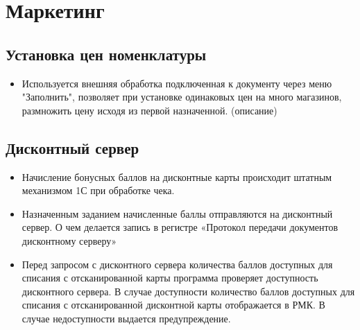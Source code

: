 \section{Маркетинг}
\subsection{Установка цен номенклатуры}


\begin{itemize}
	\item Используется внешняя обработка подключенная к документу через меню "Заполнить", позволяет при установке одинаковых цен на много магазинов, размножить цену исходя из первой назначенной. 	(описание)
\end{itemize}


\subsection{Дисконтный сервер}

\begin{itemize}
	\item Начисление бонусных баллов на дисконтные карты происходит штатным механизмом 1С
	при обработке чека.
	\item  Назначенным заданием начисленные баллы  отправляются на дисконтный сервер.
	О чем делается запись в регистре «Протокол передачи документов дисконтному серверу»
	\item Перед запросом с дисконтного сервера количества баллов доступных для списания с отсканированной
	карты программа проверяет доступность дисконтного сервера. В случае доступности количество баллов
	доступных для списания с отсканированной дисконтной карты отображается в РМК. В случае недоступности
	выдается предупреждение.  
\end{itemize}
